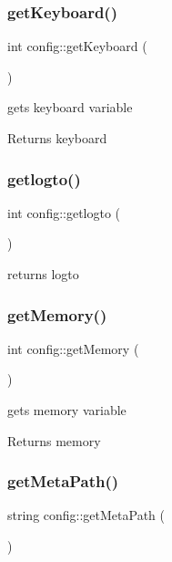 \subsubsection{\texorpdfstring{getKeyboard()}{getKeyboard()}}
{\footnotesize\ttfamily int config\+::get\+Keyboard (\begin{DoxyParamCaption}{ }\end{DoxyParamCaption})}



gets keyboard variable 

\begin{DoxyReturn}{Returns}
keyboard 
\end{DoxyReturn}
\mbox{\label{classconfig_a9bb4603f5922557dc69904e10fdb2b8a}} 
\subsubsection{\texorpdfstring{getlogto()}{getlogto()}}
{\footnotesize\ttfamily int config\+::getlogto (\begin{DoxyParamCaption}{ }\end{DoxyParamCaption})}

returns logto \mbox{\label{classconfig_a8f679a43d549ab2e0bc66536ba62e6f8}} 
\subsubsection{\texorpdfstring{getMemory()}{getMemory()}}
{\footnotesize\ttfamily int config\+::get\+Memory (\begin{DoxyParamCaption}{ }\end{DoxyParamCaption})}



gets memory variable 

\begin{DoxyReturn}{Returns}
memory 
\end{DoxyReturn}
\mbox{\label{classconfig_aed522f2e93dd2216c25b1877940c74f6}} 
\subsubsection{\texorpdfstring{getMetaPath()}{getMetaPath()}}
{\footnotesize\ttfamily string config\+::get\+Meta\+Path (\begin{DoxyParamCaption}{ }\end{DoxyParamCaption})}



